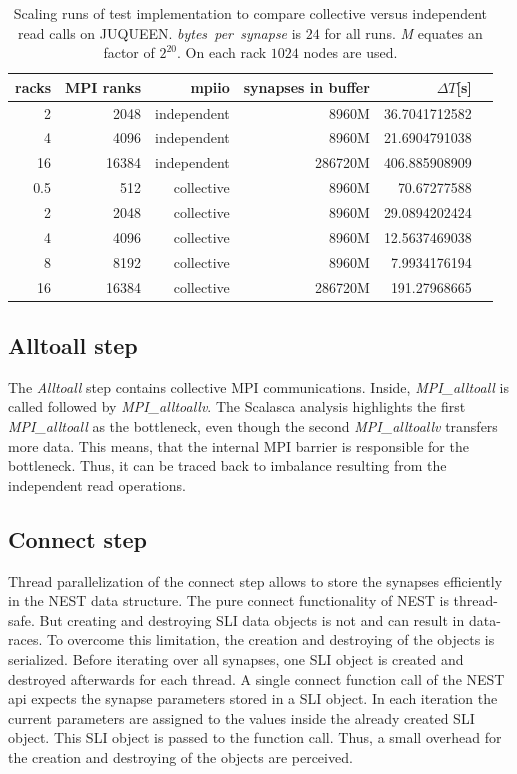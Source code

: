\begin{table}[h!]
\begin{center}
\begin{tabular}{|r|r|r|r|r|r|}
\hline
racks & MPI ranks & mpiio & synapses in buffer & $\Delta T$[s] \\
\hline\hline
2  & 2048      & independent  &  8960M & 36.7041712582\\
4  & 4096      & independent  & 8960M  & 21.6904791038\\
16  & 16384      &  independent & 286720M  & 406.885908909\\
0.5  & 512      & collective  & 8960M  & 70.67277588\\
2  & 2048      & collective  & 8960M  & 29.0894202424\\
4  & 4096      & collective  & 8960M  & 12.5637469038\\
8  & 8192      & collective  &  8960M & 7.9934176194\\
16  & 16384      &  collective & 286720M  & 191.27968665\\
\hline
\end{tabular}
\end{center}
\caption[Scaling runs of test implementation to compare collective versus independent read calls on JUQUEEN]{Scaling runs of test implementation to compare collective versus independent read calls on JUQUEEN. \emph{bytes~per~synapse} is $24$ for all runs.
  \emph{M} equates an factor of $2^{20}$. On each rack $1024$ nodes are used.}
\label{schumann:tbl:indevscol}
\end{table}
\subsection{Alltoall step}
The \emph{Alltoall} step contains collective MPI communications.
Inside, \emph{MPI\_alltoall} is called followed by \emph{MPI\_alltoallv}.
The Scalasca analysis highlights the first \emph{MPI\_alltoall} as the bottleneck,
even though the second \emph{MPI\_alltoallv} transfers more data.
This means, that the internal MPI barrier is responsible for the bottleneck.
Thus, it can be traced back to imbalance resulting from the independent read operations.

\subsection{Connect step}
\label{sec:speedup:connect}
Thread parallelization of the connect step allows to store the synapses efficiently in the NEST data structure.
The pure connect functionality of NEST is thread-safe. But creating and destroying SLI data objects is not and can result
in data-races. To overcome this limitation, the creation and destroying of the objects is serialized.
Before iterating over all synapses, one SLI object is created and destroyed afterwards for each thread.
A single connect function call of the NEST api expects the synapse parameters stored in a SLI object.
In each iteration the current parameters are assigned to the values inside the already created SLI object.
This SLI object is passed to the function call.
Thus, a small overhead for the creation and destroying of the objects are perceived.


